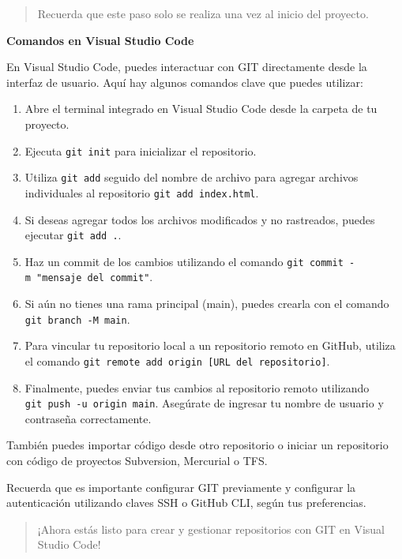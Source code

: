 \documentclass[
  letterpaper,
  DIV=11,
  numbers=noendperiod]{scrartcl}
\providecommand{\tightlist}{%
  \setlength{\itemsep}{0pt}\setlength{\parskip}{0pt}}\usepackage{longtable,booktabs,array}
\begin{document}
\begin{quote}
Recuerda que este paso solo se realiza una vez al inicio del proyecto.
\end{quote}

\textbf{Comandos en Visual Studio Code}

En Visual Studio Code, puedes interactuar con GIT directamente desde la
interfaz de usuario. Aquí hay algunos comandos clave que puedes
utilizar:

\begin{enumerate}
\def\labelenumi{\arabic{enumi}.}
\tightlist
\item
  Abre el terminal integrado en Visual Studio Code desde la carpeta de
  tu proyecto.
\item
  Ejecuta \texttt{git\ init} para inicializar el repositorio.
\item
  Utiliza \texttt{git\ add} seguido del nombre de archivo para agregar
  archivos individuales al repositorio \texttt{git\ add\ index.html}.
\item
  Si deseas agregar todos los archivos modificados y no rastreados,
  puedes ejecutar \texttt{git\ add\ .}.
\item
  Haz un commit de los cambios utilizando el comando
  \texttt{git\ commit\ -m\ "mensaje\ del\ commit"}.
\item
  Si aún no tienes una rama principal (main), puedes crearla con el
  comando \texttt{git\ branch\ -M\ main}.
\item
  Para vincular tu repositorio local a un repositorio remoto en GitHub,
  utiliza el comando
  \texttt{git\ remote\ add\ origin\ {[}URL\ del\ repositorio{]}}.
\item
  Finalmente, puedes enviar tus cambios al repositorio remoto utilizando
  \texttt{git\ push\ -u\ origin\ main}. Asegúrate de ingresar tu nombre
  de usuario y contraseña correctamente.
\end{enumerate}

También puedes importar código desde otro repositorio o iniciar un
repositorio con código de proyectos Subversion, Mercurial o TFS.

Recuerda que es importante configurar GIT previamente y configurar la
autenticación utilizando claves SSH o GitHub CLI, según tus
preferencias.

\begin{quote}
¡Ahora estás listo para crear y gestionar repositorios con GIT en Visual
Studio Code!
\end{quote}
\end{document}
